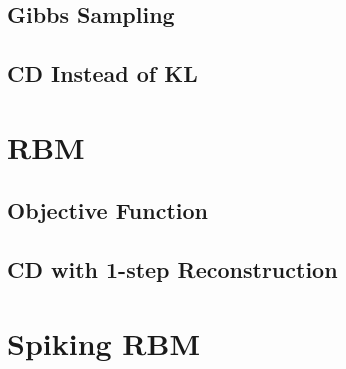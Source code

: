 \documentclass[11pt,twoside,a4paper]{article}
\begin{document}
\subsection{Gibbs Sampling}
\subsection{CD Instead of KL}
\section{RBM\cite{zhang2013rbm}}
\subsection{Objective Function}
\subsection{CD with 1-step Reconstruction}
\section{Spiking RBM\cite{neftci2013event}}

 

\end{document}
